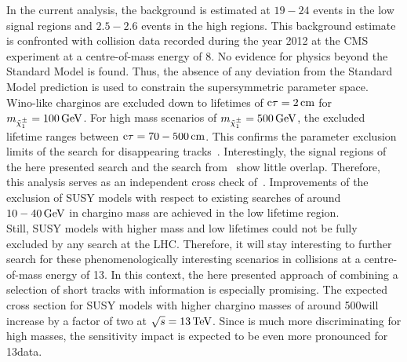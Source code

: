 In the current analysis, the background is estimated at $19-24$ events in the low \ias signal regions and $2.5-2.6$ events in the high \ias regions.
This background estimate is confronted with collision data recorded during the year 2012 at the CMS experiment at a centre-of-mass energy of 8\tev.
No evidence for physics beyond the Standard Model is found. %
Thus, the absence of any deviation from the Standard Model prediction is used to constrain the supersymmetric parameter space.
Wino-like charginos are excluded down to lifetimes of $\text{c}\tau=2\,\text{cm}$ for $m_{\tilde{\chi}^{\pm}_{1}}=100\,\text{Ge}\kern-0.06667em\text{V}$.
For high mass scenarios of $m_{\tilde{\chi}^{\pm}_{1}}=500\,\text{Ge}\kern-0.06667em\text{V}$, the excluded lifetime ranges between $\text{c}\tau=70-500\,\text{cm}$.
This confirms the parameter exclusion limits of the search for disappearing tracks~\cite{bib:CMS:DT_8TeV}.
Interestingly, the signal regions of the here presented search and the search from~\cite{bib:CMS:DT_8TeV} show little overlap.
Therefore, this analysis serves as an independent cross check of~\cite{bib:CMS:DT_8TeV}.
Improvements of the exclusion of SUSY models with respect to existing searches of around $10-40\,\text{Ge}\kern-0.06667em\text{V}$ in chargino mass are achieved in the low lifetime region.\\

Still, SUSY models with higher mass and low lifetimes could not be fully excluded by any search at the LHC.
Therefore, it will stay interesting to further search for these phenomenologically interesting scenarios in collisions at a centre-of-mass energy of 13\tev.
In this context, the here presented approach of combining a selection of short tracks with \dedx information is especially promising.
The expected cross section for SUSY models with higher chargino masses of around 500\gev will increase by a factor of two at $\sqrt{s}= 13\,\text{Te}\kern-0.06667em\text{V}$.
Since \dedx is much more discriminating for high masses, the sensitivity impact is expected to be even more pronounced for 13\tev data.


